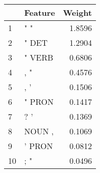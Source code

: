 \begin{tabular}{llr}
\toprule
{} & Feature &  Weight \\
\midrule
1  &     " " &  1.8596 \\
2  &   " DET &  1.2904 \\
3  &  " VERB &  0.6806 \\
4  &     , " &  0.4576 \\
5  &     , ' &  0.1506 \\
6  &  " PRON &  0.1417 \\
7  &     ? ' &  0.1369 \\
8  &  NOUN , &  0.1069 \\
9  &  ' PRON &  0.0812 \\
10 &     ; " &  0.0496 \\
\bottomrule
\end{tabular}
